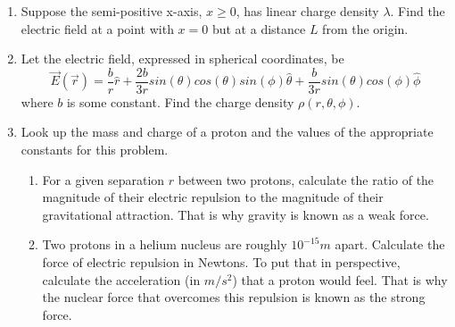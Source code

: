 \documentclass[fleqn]{article}
\begin{document}
\begin{enumerate}
        

    \item Suppose the semi-positive x-axis, $x\geq 0$, has linear charge density $\lambda$.
    Find the electric field at a point with $x=0$ but at a distance $L$ from the origin.

        

    \item Let the electric field, expressed in spherical coordinates, be
    $$\overrightarrow{E}(\overrightarrow{r})=\dfrac{b}{r}\hat{r}
    +\dfrac{2b}{3r} sin(\theta) cos(\theta) sin(\phi) \hat{\theta}
    +\dfrac{b}{3r} sin(\theta) cos(\phi) \hat{\phi}$$
    where $b$ is some constant. Find the charge density $\rho(r, \theta, \phi)$.

        

    \item Look up the mass and charge of a proton and the values of the appropriate constants for this problem.
    \begin{enumerate}
      \item For a given separation $r$ between two protons, calculate the ratio
      of the magnitude of their electric repulsion to the magnitude of
      their gravitational attraction. That is why gravity is known as a
      weak force.

        

      \item Two protons in a helium nucleus are roughly $10^{-15}m$ apart. Calculate the force of 
      electric repulsion in Newtons. To put that in perspective, calculate the acceleration (in $m/s^2$) that a proton
      would feel. That is why the nuclear force that overcomes this repulsion is known as the strong force.

        

    \end{enumerate}

  \end{enumerate}
\end{document}
